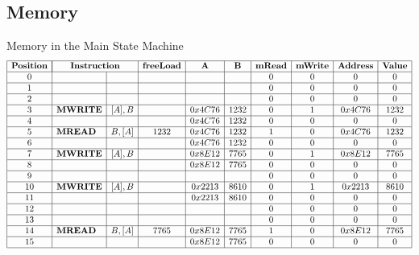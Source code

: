 \subsection{Memory}


\begin{frame}{Memory in the Main State Machine}
\scriptsize
\[
\begin{array}{|c|l|c|c|c|c|c|c|c|c|c|}
\hline
\mathbf{Position} & \multicolumn{2}{|c|}{\mathbf{Instruction}} & \mathbf{freeLoad}  & \mathbf{A} & \mathbf{B} & \mathbf{mRead} & \mathbf{mWrite} & \mathbf{Address} & \mathbf{Value} \\ \hline
0 &  &  &  &  &  & 0 & 0 & 0 & 0 \\ \hline
1 &  &  &  &  &  & 0 & 0 & 0 & 0 \\ \hline
2 &  &  &  &  &  & 0 & 0 & 0 & 0 \\ \hline
3 & \mathbf{MWRITE} & [A], B &  & 0x4C76 & 1232 & 0 & 1 & 0x4C76 & 1232 \\ \hline
4 &  &  &  & 0x4C76 & 1232 & 0 & 0 & 0 & 0 \\ \hline
5 & \mathbf{MREAD} & B, [A] & 1232 & 0x4C76 & 1232 & 1 & 0 & 0x4C76 & 1232 \\ \hline
6 &  &  &  & 0x4C76 & 1232 & 0 & 0 & 0 & 0 \\ \hline
7 & \mathbf{MWRITE} & [A], B &  & 0x8E12 & 7765 & 0 & 1 & 0x8E12 & 7765 \\ \hline
8 &  &  &  & 0x8E12 & 7765 & 0 & 0 & 0 & 0 \\ \hline
9 &  &  &  &  &  & 0 & 0 & 0 & 0 \\ \hline
10 & \mathbf{MWRITE} & [A], B &  & 0x2213 & 8610 & 0 & 1 & 0x2213 & 8610 \\ \hline
11 &  &  &  & 0x2213 & 8610 & 0 & 0 & 0 & 0 \\ \hline
12 &  &  &  &  &  & 0 & 0 & 0 & 0 \\ \hline
13 &  &  &  &  &  & 0 & 0 & 0 & 0 \\ \hline
14 & \mathbf{MREAD} & B, [A] & 7765 & 0x8E12 & 7765 & 1 & 0 & 0x8E12 & 7765 \\ \hline
15 &  &  &  & 0x8E12 & 7765 & 0 & 0 & 0 & 0 \\ \hline
\end{array}
\]
\end{frame}







